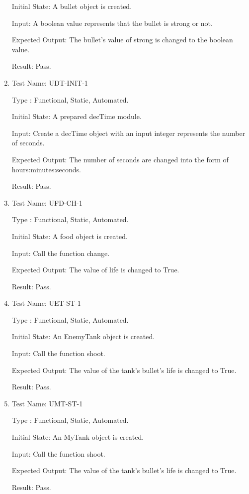 \documentclass[12pt, titlepage]{article}
\begin{document}
\begin{enumerate}
Initial State: A bullet object is created.

Input: A boolean value represents that the bullet is strong or not.

Expected Output: The bullet's value of strong is changed to the boolean value.

Result: Pass.\\

\item{Test Name: UDT-INIT-1}

Type : Functional, Static, Automated.

Initial State: A prepared decTime module.

Input: Create a decTime object with an input integer represents the number of seconds.

Expected Output: The number of seconds are changed into the form of hours:minutes:seconds.

Result: Pass.\\

\item{Test Name: UFD-CH-1}

Type : Functional, Static, Automated.

Initial State: A food object is created.

Input: Call the function change.

Expected Output: The value of life is changed to True.

Result: Pass.\\

\item{Test Name: UET-ST-1}

Type : Functional, Static, Automated.

Initial State: An EnemyTank object is created.

Input: Call the function shoot.

Expected Output: The value of the tank's bullet's life is changed to True.

Result: Pass.\\

\item{Test Name: UMT-ST-1}

Type : Functional, Static, Automated.

Initial State: An MyTank object is created.

Input: Call the function shoot.

Expected Output: The value of the tank's bullet's life is changed to True.

Result: Pass.\\


\end{enumerate}
\end{document}
